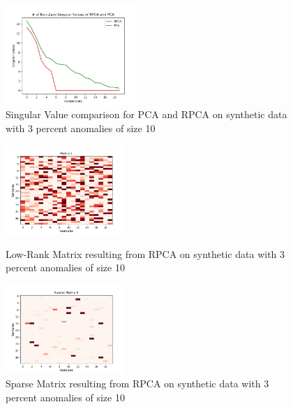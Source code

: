\documentclass{article}
\begin{document}
\begin{figure}[H]
    \centering
    \includegraphics[width=50mm, scale=0.5]{Singular_Value_Plot_Test_120AnomSize10.jpg}
    \caption{Singular Value comparison for PCA and RPCA on synthetic data with 3 percent anomalies of size 10}
    \label{fig:singvaltrain12010}
\end{figure}
\begin{figure}[H]
\begin{minipage}[b]{0.45\linewidth}
    \centering
    \includegraphics[width=45mm, scale=0.5]{L_120AnomSize10.jpg}
    \caption{Low-Rank Matrix resulting from RPCA on synthetic data with 3 percent anomalies of size 10}
    \label{fig:Ltrain12010}
\end{minipage}
\quad
\begin{minipage}[b]{0.45\linewidth}
    \includegraphics[width=45mm, scale=0.5]{S_120AnomSize10.jpg}
    \caption{Sparse Matrix resulting from RPCA on synthetic data with 3 percent anomalies of size 10}
    \label{fig:Strain12010}
\end{minipage}
\end{figure}
\end{document}

